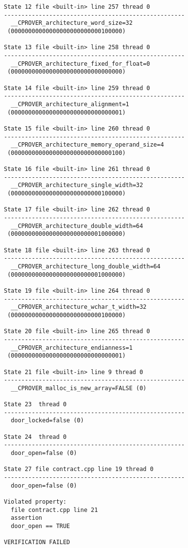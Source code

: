 \begin{lstlisting}
State 12 file <built-in> line 257 thread 0
----------------------------------------------------
  __CPROVER_architecture_word_size=32
 (00000000000000000000000000100000)

State 13 file <built-in> line 258 thread 0
----------------------------------------------------
  __CPROVER_architecture_fixed_for_float=0
 (00000000000000000000000000000000)

State 14 file <built-in> line 259 thread 0
----------------------------------------------------
  __CPROVER_architecture_alignment=1
 (00000000000000000000000000000001)

State 15 file <built-in> line 260 thread 0
----------------------------------------------------
  __CPROVER_architecture_memory_operand_size=4
 (00000000000000000000000000000100)

State 16 file <built-in> line 261 thread 0
----------------------------------------------------
  __CPROVER_architecture_single_width=32
 (00000000000000000000000000100000)

State 17 file <built-in> line 262 thread 0
----------------------------------------------------
  __CPROVER_architecture_double_width=64
 (00000000000000000000000001000000)

State 18 file <built-in> line 263 thread 0
----------------------------------------------------
  __CPROVER_architecture_long_double_width=64
 (00000000000000000000000001000000)

State 19 file <built-in> line 264 thread 0
----------------------------------------------------
  __CPROVER_architecture_wchar_t_width=32
 (00000000000000000000000000100000)

State 20 file <built-in> line 265 thread 0
----------------------------------------------------
  __CPROVER_architecture_endianness=1
 (00000000000000000000000000000001)

State 21 file <built-in> line 9 thread 0
----------------------------------------------------
  __CPROVER_malloc_is_new_array=FALSE (0)

State 23  thread 0
----------------------------------------------------
  door_locked=false (0)

State 24  thread 0
----------------------------------------------------
  door_open=false (0)

State 27 file contract.cpp line 19 thread 0
----------------------------------------------------
  door_open=false (0)

Violated property:
  file contract.cpp line 21
  assertion
  door_open == TRUE

VERIFICATION FAILED

\end{lstlisting}




